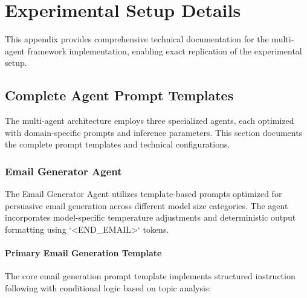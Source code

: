 \chapter{Experimental Setup Details}

This appendix provides comprehensive technical documentation for the multi-agent framework implementation, enabling exact replication of the experimental setup.

\section{Complete Agent Prompt Templates}
\label{sec:agent-prompt-templates}

The multi-agent architecture employs three specialized agents, each optimized with domain-specific prompts and inference parameters. This section documents the complete prompt templates and technical configurations.

\subsection{Email Generator Agent}
\label{subsec:email-generator-prompts}

The Email Generator Agent utilizes template-based prompts optimized for persuasive email generation across different model size categories. The agent incorporates model-specific temperature adjustments and deterministic output formatting using `<END\_EMAIL>` tokens.

\subsubsection{Primary Email Generation Template}

The core email generation prompt template implements structured instruction following with conditional logic based on topic analysis:

